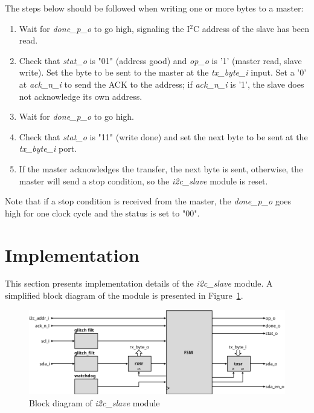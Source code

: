 \documentclass[a4paper,11pt]{article}
\begin{document}
The steps below should be followed when writing one or more bytes to a master:

\begin{enumerate}
  \item Wait for \textit{done\_p\_o} to go high, signaling the I$^2$C address of the slave
    has been read.
  \item Check that \textit{stat\_o} is "01" (address good) and \textit{op\_o} is '1' 
    (master read, slave write). Set the byte to be sent to the master at the 
    \textit{tx\_byte\_i} input. Set a '0' at \textit{ack\_n\_i} to send the ACK to the address; 
    if \textit{ack\_n\_i} is '1', the slave does not acknowledge its own address.
  \item Wait for \textit{done\_p\_o} to go high.
  \item Check that \textit{stat\_o} is "11" (write done) and set the next byte to be
    sent at the \textit{tx\_byte\_i} port.
  \item If the master acknowledges the transfer, the next byte is sent, otherwise, the master
    will send a stop condition, so the \textit{i2c\_slave} module is reset.
\end{enumerate}

Note that if a stop condition is received from the master, the \textit{done\_p\_o} goes high for
one clock cycle and the status is set to "00".

\section{Implementation}
\label{sec:implem}

This section presents implementation details of the \textit{i2c\_slave} module. A simplified
block diagram of the module is presented in Figure~\ref{fig:i2c-slave-bd}.

\begin{figure}[h]
  \centerline{\includegraphics[width=\textwidth]{fig/i2c-slave-bd}}
  \caption{Block diagram of \textit{i2c\_slave} module}
  \label{fig:i2c-slave-bd}
\end{figure}
\end{document}
